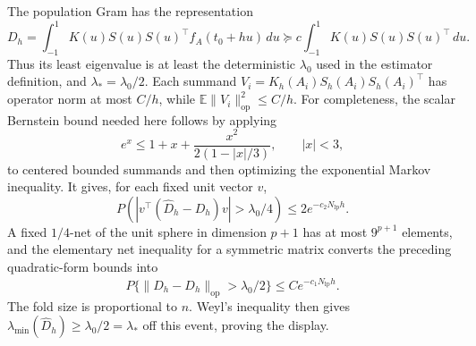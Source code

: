 The population Gram has the representation
\[
D_h=\int_{-1}^1K(u)S(u)S(u)^\top f_A(t_0+hu)\,du
\succeq c\int_{-1}^1K(u)S(u)S(u)^\top\,du.
\]
Thus its least eigenvalue is at least the deterministic \(\lambda_0\) used in the estimator definition, and \(\lambda_*=\lambda_0/2\). Each summand \(V_i=K_h(A_i)S_h(A_i)S_h(A_i)^\top\) has operator norm at most \(C/h\), while \(\mathbb E\lVert V_i\rVert_{\mathrm{op}}^2\le C/h\). For completeness, the scalar Bernstein bound needed here follows by applying
\[
e^x\le1+x+\frac{x^2}{2(1-\lvert x\rvert/3)},\qquad \lvert x\rvert<3,
\]
to centered bounded summands and then optimizing the exponential Markov inequality. It gives, for each fixed unit vector \(v\),
\[
P\!\left(\left\lvert v^\top(\widehat D_h-D_h)v\right\rvert>\lambda_0/4\right)
\le2e^{-c_2N_{\mathrm{lp}}h}.
\]
A fixed \(1/4\)-net of the unit sphere in dimension \(p+1\) has at most \(9^{p+1}\) elements, and the elementary net inequality for a symmetric matrix converts the preceding quadratic-form bounds into
\[
P\{\lVert\widehat D_h-D_h\rVert_{\mathrm{op}}>\lambda_0/2\}
\le C e^{-c_1N_{\mathrm{lp}}h}.
\]
The fold size is proportional to \(n\). Weyl's inequality then gives \(\lambda_{\min}(\widehat D_h)\ge\lambda_0/2=\lambda_*\) off this event, proving the display.